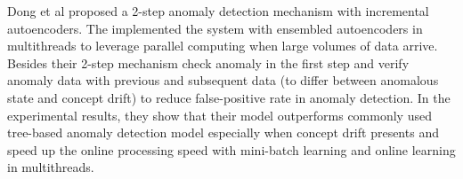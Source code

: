 Dong et al proposed a 2-step anomaly detection mechanism with incremental autoencoders. The implemented the system with ensembled autoencoders in multithreads to leverage parallel computing when large volumes of data arrive. Besides their 2-step mechanism check anomaly in the first step and verify anomaly data with previous and subsequent data (to differ between anomalous state and concept drift) to reduce false-positive rate in anomaly detection. In the experimental results, they show that their model outperforms commonly used tree-based anomaly detection model especially when concept drift presents and speed up the online processing speed with mini-batch learning and online learning in multithreads.








